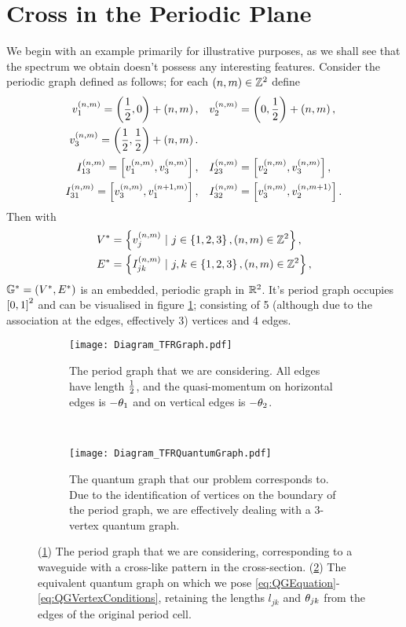 \section{Cross in the Periodic Plane} \label{sec:ExampleCrossInPlane}
We begin with an example primarily for illustrative purposes, as we shall see that the spectrum we obtain doesn't possess any interesting features.
Consider the periodic graph defined as follows; for each $\left( n,m \right)\in\mathbb{Z}^2$ define
\begin{align*}
	v_1^{\left( n,m \right)} = \left( \frac{1}{2},0 \right) + \left( n,m \right), 
	&\quad v_2^{\left( n,m \right)} = \left( 0,\frac{1}{2} \right) + \left( n,m \right), \\
	v_3^{\left( n,m \right)} = \left( \frac{1}{2},\frac{1}{2} \right) + \left( n,m \right). & \\
	I_{13}^{\left( n,m \right)} = \left[ v_1^{\left( n,m \right)}, v_3^{\left( n,m \right)} \right],
	&\quad I_{23}^{\left( n,m \right)} = \left[ v_2^{\left( n,m \right)}, v_3^{\left( n,m \right)} \right], \\
	I_{31}^{\left( n,m \right)} = \left[ v_3^{\left( n,m \right)}, v_1^{\left( n+1,m \right)} \right],
	&\quad I_{32}^{\left( n,m \right)} = \left[ v_3^{\left( n,m \right)}, v_2^{\left( n,m+1 \right)} \right].
\end{align*}
Then with 
\begin{align*}
	V^* &= \clbracs{v_j^{\bracs{n,m}} \ \vert \ j\in\clbracs{1,2,3}, \bracs{n,m}\in\integers^2}, \\
	E^* &= \clbracs{I_{jk}^{\bracs{n,m}} \ \vert \ j,k\in\clbracs{1,2,3}, \bracs{n,m}\in\integers^2},
\end{align*}
$\mathbb{G}^* = \left( V^*,E^* \right)$ is an embedded, periodic graph in $\mathbb{R}^2$.
It's period graph occupies $\left[ 0,1 \right]^2$ and can be visualised in figure \ref{fig:Diagram_TFRGraph}; consisting of 5 (although due to the association at the edges, effectively 3) vertices and 4 edges.
\begin{figure}[b!]
	\centering
	\begin{subfigure}[t]{0.45\textwidth}
		\centering
		\texttt{[image: Diagram\_TFRGraph.pdf]}
		\caption{\label{fig:Diagram_TFRGraph} The period graph that we are considering. All edges have length $\frac{1}{2}$, and the quasi-momentum on horizontal edges is $-\theta_1$ and on vertical edges is $-\theta_2$.}
	\end{subfigure}
	~
	\begin{subfigure}[t]{0.45\textwidth}
		\centering
		\texttt{[image: Diagram\_TFRQuantumGraph.pdf]}
		\caption{\label{fig:Diagram_TFRQuantumGraph} The quantum graph that our problem corresponds to. Due to the identification of vertices on the boundary of the period graph, we are effectively dealing with a 3-vertex quantum graph.}
	\end{subfigure}
	\caption{\label{fig:5VertexCross} (\ref{fig:Diagram_TFRGraph}) The period graph that we are considering, corresponding to a waveguide with a cross-like pattern in the cross-section. (\ref{fig:Diagram_TFRQuantumGraph}) The equivalent quantum graph on which we pose \eqref{eq:QGEquation}-\eqref{eq:QGVertexConditions}, retaining the lengths $l_{jk}$ and $\theta_{jk}$ from the edges of the original period cell.}
\end{figure}
